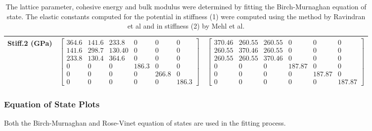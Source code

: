 \begin{table}[ht]
\begin{tabular}{lcccccc}
Stiff.2 (GPa) & \multicolumn{3}{c}{$\begin{bmatrix} 364.6 & 141.6 & 233.8 & 0 & 0 & 0 \\ 141.6 & 298.7 & 130.40 & 0 & 0 & 0 \\ 233.8 & 130.4 & 364.6 & 0 & 0 & 0 \\ 0 & 0 & 0 & 186.3 & 0 & 0 \\ 0 & 0 & 0 & 0 & 266.8 & 0 \\ 0 & 0 & 0 & 0 & 0 & 186.3 \end{bmatrix}$}   & \multicolumn{3}{c}{$\begin{bmatrix} 370.46 & 260.55 & 260.55 & 0 & 0 & 0 \\ 260.55 & 370.46 & 260.55 & 0 & 0 & 0 \\ 260.55 & 260.55 & 370.46 & 0 & 0 & 0 \\ 0 & 0 & 0 & 187.87 & 0 & 0 \\ 0 & 0 & 0 & 0 & 187.87 & 0 \\ 0 & 0 & 0 & 0 & 0 & 187.87 \end{bmatrix}$} \\
\hline\hline
\end{tabular}
\caption{The lattice parameter, cohesive energy and bulk modulus were determined by fitting the Birch-Murnaghan equation of state.  The elastic constants computed for the potential in stiffness (1) were computed using the method by Ravindran et al\cite{dfttisiravindran} and in stiffness (2) by Mehl et al\cite{mehlsp}\cite{elasticpropertiesmehl}.}
\label{table:feru-fefcc-dftvspotential}
\end{table}


\subsubsection{Equation of State Plots}

Both the Birch-Murnaghan and Rose-Vinet equation of states are used in the fitting process.

